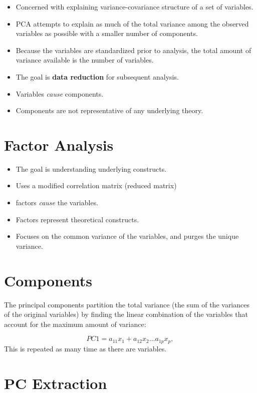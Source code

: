 \documentclass[
]{book}
\providecommand{\tightlist}{%
  \setlength{\itemsep}{0pt}\setlength{\parskip}{0pt}}
\begin{document}
\begin{itemize}
\tightlist
\item
  Concerned with explaining variance-covariance structure of a set of variables.
\item
  PCA attempts to explain as much of the total variance among the observed variables as possible with a smaller number of components.
\item
  Because the variables are standardized prior to analysis, the total amount of variance available is the number of variables.
\item
  The goal is \textbf{data reduction} for subsequent analysis.
\item
  Variables \emph{cause} components.
\item
  Components are not representative of any underlying theory.
\end{itemize}

\hypertarget{factor-analysis-1}{%
\section{Factor Analysis}\label{factor-analysis-1}}

\begin{itemize}
\tightlist
\item
  The goal is understanding underlying constructs.
\item
  Uses a modified correlation matrix (reduced matrix)
\item
  factors \emph{cause} the variables.
\item
  Factors represent theoretical constructs.
\item
  Focuses on the common variance of the variables, and purges the unique variance.
\end{itemize}

\hypertarget{components}{%
\section{Components}\label{components}}

The principal components partition the total variance (the sum of the variances of the original variables) by finding the linear combination of the variables that account for the maximum amount of variance:

\[
PC1 = a_{11}x_1 + a_{12}x_2 ... a_{1p}x_p, 
\]
This is repeated as many time as there are variables.

\hypertarget{pc-extraction}{%
\section{PC Extraction}\label{pc-extraction}}
\end{document}
